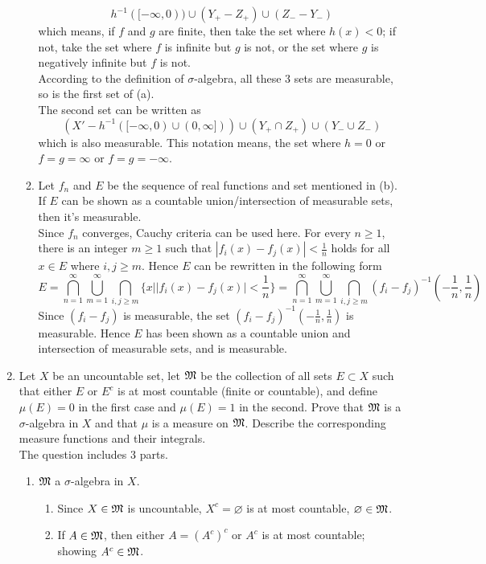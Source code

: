 \documentclass{article}
\begin{document}
\begin{enumerate}
\begin{enumerate}
 		\[
 		h^{-1}([-\infty,0))\cup(Y_+-Z_+)\cup(Z_--Y_-)
 		\]
 		which means, if $f$ and $g$ are finite, then take the set where $h(x)<0$; if not, take the set where $f$ is infinite but $g$ is not, or the set where $g$ is negatively infinite but $f$ is not.\\
 		According to the definition of $\sigma$-algebra, all these 3 sets are measurable, so is the first set of (a).\\
 		The second set can be written as
 		\[
 			(X'-h^{-1}([-\infty,0)\cup(0,\infty]))\cup(Y_+\cap{Z_+})\cup(Y_-\cup{Z_-})
 		\]
 		which is also measurable. This notation means, the set where $h=0$ or $f=g=\infty$ or $f=g=-\infty$.
 		\item Let $f_n$ and $E$ be the sequence of real functions and set mentioned in (b). If $E$ can be shown as a countable union/intersection of measurable sets, then it's measurable.\\
 		Since $f_n$ converges, Cauchy criteria can be used here. For every $n\geq 1$, there is an integer $m \geq 1$ such that $|f_i(x)-f_j(x)|<\frac{1}{n}$ holds for all $x\in{E}$ where $i,j\geq m$. Hence $E$ can be rewritten in the following form
 		\[
 			E=\bigcap_{n=1}^{\infty}\bigcup_{m=1}^{\infty}\bigcap_{i,j\geq m}\{x||f_i(x)-f_j(x)|<\frac{1}{n}\}=\bigcap_{n=1}^{\infty}\bigcup_{m=1}^{\infty}\bigcap_{i,j\geq m}(f_i-f_j)^{-1}(-\frac{1}{n},\frac{1}{n})
 		\]
 		Since $(f_i-f_j)$ is measurable, the set $(f_i-f_j)^{-1}(-\frac{1}{n},\frac{1}{n})$ is measurable. Hence $E$ has been shown as a countable union and intersection of measurable sets, and is measurable.
 		\end{enumerate}
 	\item \exercise Let $X$ be an uncountable set, let $\mathfrak{M}$ be the collection of all sets $E\subset X$ such that either $E$ or $E^c$ is at most countable (finite or countable), and define $\mu(E)=0$ in the first case and $\mu(E)=1$ in the second. Prove that $\mathfrak{M}$ is a $\sigma$-algebra in $X$ and that $\mu$ is a measure on $\mathfrak{M}$. Describe the corresponding measure functions and their integrals.\\
 	\solution The question includes 3 parts.
 	\begin{enumerate}
 		\item $\mathfrak{M}$ a $\sigma$-algebra in $X$.
 		\begin{enumerate}
 			\item Since $X\in\mathfrak{M}$ is uncountable, $X^c=\varnothing$ is at most countable, $\varnothing\in\mathfrak{M}$.
 			\item If $A\in\mathfrak{M}$, then either $A=(A^c)^c$ or $A^c$ is at most countable; showing $A^c\in\mathfrak{M}$.

\end{enumerate}
\end{enumerate}
\end{enumerate}
\end{document}
